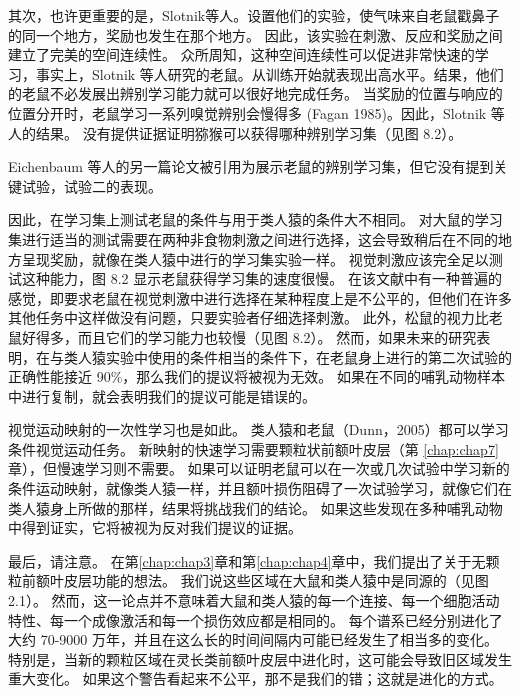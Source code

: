 其次，也许更重要的是，Slotnik等人。设置他们的实验，使气味来自老鼠戳鼻子的同一个地方，奖励也发生在那个地方。
因此，该实验在刺激、反应和奖励之间建立了完美的空间连续性。
众所周知，这种空间连续性可以促进非常快速的学习\cite{cowey1968varying}，事实上，Slotnik 等人研究的老鼠。从训练开始就表现出高水平。结果，他们的老鼠不必发展出辨别学习能力就可以很好地完成任务。
当奖励的位置与响应的位置分开时，老鼠学习一系列嗅觉辨别会慢得多 (Fagan 1985)。因此，Slotnik 等人的结果。
没有提供证据证明猕猴可以获得哪种辨别学习集（见图 8.2）。
\par


Eichenbaum 等人的另一篇论文\cite{eichenbaum1986normal}被引用为展示老鼠的辨别学习集，但它没有提到关键试验，试验二的表现。
\par


因此，在学习集上测试老鼠的条件与用于类人猿的条件大不相同。
对大鼠的学习集进行适当的测试需要在两种非食物刺激之间进行选择，这会导致稍后在不同的地方呈现奖励，就像在类人猿中进行的学习集实验一样。
视觉刺激应该完全足以测试这种能力，图 8.2 显示老鼠获得学习集的速度很慢。
在该文献中有一种普遍的感觉，即要求老鼠在视觉刺激中进行选择在某种程度上是不公平的，但他们在许多其他任务中这样做没有问题，只要实验者仔细选择刺激\cite{bussey2008touchscreen}。
此外，松鼠的视力比老鼠好得多，而且它们的学习能力也较慢（见图 8.2）。
然而，如果未来的研究表明，在与类人猿实验中使用的条件相当的条件下，在老鼠身上进行的第二次试验的正确性能接近 90$\%$，那么我们的提议将被视为无效。
如果在不同的哺乳动物样本中进行复制，就会表明我们的提议可能是错误的。
\par


视觉运动映射的一次性学习也是如此。
类人猿和老鼠\cite{dumont2007functional}（Dunn，2005）都可以学习条件视觉运动任务。
新映射的快速学习需要颗粒状前额叶皮层（第 \ref{chap:chap7} 章），但慢速学习则不需要\cite{bussey2001role}。
如果可以证明老鼠可以在一次或几次试验中学习新的条件运动映射，就像类人猿一样，并且额叶损伤阻碍了一次试验学习，就像它们在类人猿身上所做的那样，结果将挑战我们的结论。
如果这些发现在多种哺乳动物中得到证实，它将被视为反对我们提议的证据。
\par


最后，请注意。
在第\ref{chap:chap3}章和第\ref{chap:chap4}章中，我们提出了关于无颗粒前额叶皮层功能的想法。
我们说这些区域在大鼠和类人猿中是同源的（见图 2.1）。
然而，这一论点并不意味着大鼠和类人猿的每一个连接、每一个细胞活动特性、每一个成像激活和每一个损伤效应都是相同的。
每个谱系已经分别进化了大约 70-9000 万年，并且在这么长的时间间隔内可能已经发生了相当多的变化。
特别是，当新的颗粒区域在灵长类前额叶皮层中进化时，这可能会导致旧区域发生重大变化。
如果这个警告看起来不公平，那不是我们的错；这就是进化的方式。



